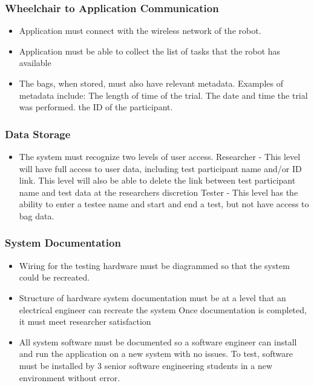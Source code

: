 \documentclass[onecolumn, draftclsnofoot,10pt, compsoc]{IEEEtran}
\begin{document}
\subsubsection{Wheelchair to Application Communication}
\begin{itemize}
	\item Application must connect with the wireless network of the robot.
	\item Application must be able to collect the list of tasks that the robot has available
	\item The bags, when stored, must also have relevant metadata. Examples of metadata include:
	\subitem The length of time of the trial.
	\subitem The date and time the trial was performed.
	\subitem the ID of the participant.
\end{itemize}
\subsubsection{Data Storage}
\begin{itemize}
	\item The system must recognize two levels of user access.
	\subitem Researcher - This level will have full access to user data, including test participant name and/or ID link.
	\subsubitem This level will also be able to delete the link between test participant name and test data at the researchers discretion
	\subitem Tester - This level has the ability to enter a testee name and start and end a test, but not have access to bag data.
\end{itemize}
\subsubsection{System Documentation}
\begin{itemize}

	\item Wiring for the testing hardware must be diagrammed so that the system could be recreated. 
	\item Structure of hardware system documentation must be at a level that an electrical engineer can recreate the system
		\subitem Once documentation is completed, it must meet researcher satisfaction
	\item All system software must be documented so a software engineer can install and run the application on a new system with no issues. 
		\subitem To test, software must be installed by 3 senior software engineering students in a new environment without error. 
\end{itemize}
\end{document}
